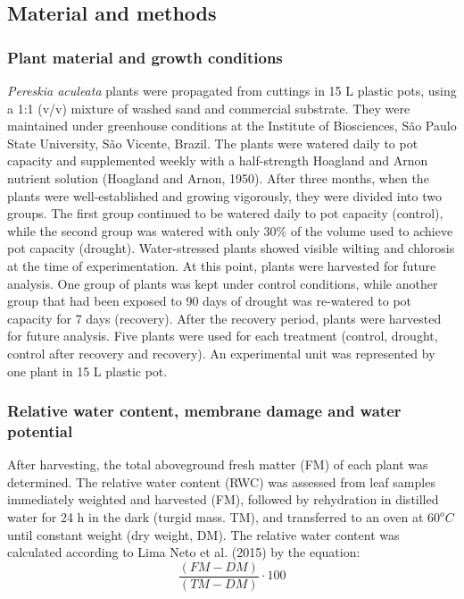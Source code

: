 \documentclass[
  12pt,
  letterpaper,
  DIV=11,
  numbers=noendperiod]{scrartcl}
\begin{document}
\hypertarget{material-and-methods}{%
\subsection{Material and methods}\label{material-and-methods}}

\hypertarget{plant-material-and-growth-conditions}{%
\subsubsection{Plant material and growth
conditions}\label{plant-material-and-growth-conditions}}

\emph{Pereskia aculeata} plants were propagated from cuttings in 15 L
plastic pots, using a 1:1 (v/v) mixture of washed sand and commercial
substrate. They were maintained under greenhouse conditions at the
Institute of Biosciences, São Paulo State University, São Vicente,
Brazil. The plants were watered daily to pot capacity and supplemented
weekly with a half-strength Hoagland and Arnon nutrient solution
(Hoagland and Arnon, 1950). After three months, when the plants were
well-established and growing vigorously, they were divided into two
groups. The first group continued to be watered daily to pot capacity
(control), while the second group was watered with only 30\% of the
volume used to achieve pot capacity (drought). Water-stressed plants
showed visible wilting and chlorosis at the time of experimentation. At
this point, plants were harvested for future analysis. One group of
plants was kept under control conditions, while another group that had
been exposed to 90 days of drought was re-watered to pot capacity for 7
days (recovery). After the recovery period, plants were harvested for
future analysis. Five plants were used for each treatment (control,
drought, control after recovery and recovery). An experimental unit was
represented by one plant in 15 L plastic pot.

\hypertarget{relative-water-content-membrane-damage-and-water-potential}{%
\subsubsection{Relative water content, membrane damage and water
potential}\label{relative-water-content-membrane-damage-and-water-potential}}

After harvesting, the total aboveground fresh matter (FM) of each plant
was determined. The relative water content (RWC) was assessed from leaf
samples immediately weighted and harvested (FM), followed by rehydration
in distilled water for 24 h in the dark (turgid mass. TM), and
transferred to an oven at \(60^o C\) until constant weight (dry weight,
DM). The relative water content was calculated according to Lima Neto et
al. (2015) by the equation: \[\frac{(FM - DM)} {(TM - DM)} \cdot 100\]
\end{document}
